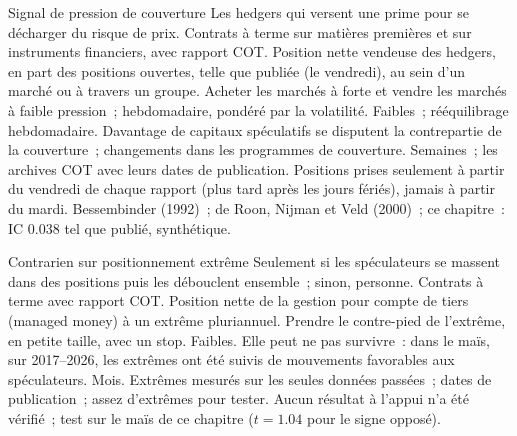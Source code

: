 \begin{strategyfile}{Signal de pression de couverture}\label{strat:s1:positioning-and-sentiment:hedging}
 Les hedgers qui versent une prime pour se décharger du risque de prix.
 Contrats à terme sur matières premières et sur instruments financiers, avec rapport COT.
 Position nette vendeuse des hedgers, en part des positions ouvertes, telle que publiée (le vendredi), au sein d'un marché ou à travers un groupe.
 Acheter les marchés à forte  et vendre les marchés à faible pression~; hebdomadaire, pondéré par la volatilité.
 Faibles~; rééquilibrage hebdomadaire.
 Davantage de capitaux spéculatifs se disputent la contrepartie de la couverture~; changements dans les programmes de couverture.
 Semaines~; les archives COT avec leurs dates de publication.
 Positions prises seulement à partir du vendredi de chaque rapport (plus tard après les jours fériés), jamais à partir du mardi.
 Bessembinder (1992)~; de Roon, Nijman et Veld (2000)~; ce chapitre~: IC 0.038 tel que publié, synthétique.
\end{strategyfile}

\begin{strategyfile}{Contrarien sur positionnement extrême}\label{strat:s1:positioning-and-sentiment:extreme}
 Seulement si les spéculateurs se massent dans des positions puis les débouclent ensemble~; sinon, personne.
 Contrats à terme avec rapport COT.
 Position nette de la gestion pour compte de tiers (managed money) à un extrême pluriannuel.
 Prendre le contre-pied de l'extrême, en petite taille, avec un stop.
 Faibles.
 Elle peut ne pas survivre~: dans le maïs, sur 2017--2026, les extrêmes ont été suivis de mouvements favorables aux spéculateurs.
 Mois.
 Extrêmes mesurés sur les seules données passées~; dates de publication~; assez d'extrêmes pour tester.
 Aucun résultat à l'appui n'a été vérifié~; test sur le maïs de ce chapitre ($t = 1.04$ pour le signe opposé).
\end{strategyfile}

